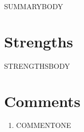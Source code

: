 \documentclass[11pt]{article}
\begin{document}
SUMMARYBODY
\section*{Strengths}
STRENGTHSBODY
\section*{Comments}
\begin{enumerate}
\item COMMENTONE
\end{enumerate}
\end{document}
